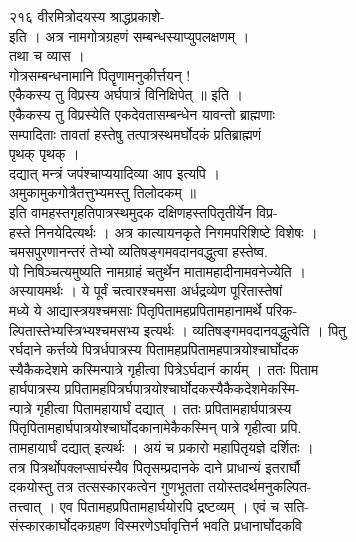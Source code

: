 \documentclass[11pt, openany]{book}
\begin{document}
{{{{{{{{{{{{{{{{{{{{{{{{{{{{{{{{{{{{{{{{{{{{{{{{{{{{{{{{{{{{{{{{{{{{{{{{{{{{{{{{{{{{{{{{{{{{{{{{{{{{{{{{{{{{{{{{{{{{{{{{{{{{{२१६ वीरमित्रोदयस्य श्राद्धप्रकाशे-}{\\
इति । अत्र नामगोत्रग्रहणं सम्बन्धस्याप्युपलक्षणम् ।\\
तथा च व्यास ।\\
गोत्रसम्बन्धनामानि पितॄणामनुकीर्त्तयन् !\\
एकैकस्य तु विप्रस्य अर्घपात्रं विनिक्षिपेत् ॥ इति ।\\
एकैकस्य तु विप्रस्येति एकदेवतासम्बन्धेन यावन्तो ब्राह्मणाः\\
सम्पादिताः तावतां हस्तेषु तत्पात्रस्थमर्घोदकं प्रतिब्राह्मणं\\
पृथक् पृथक् ।\\
दद्यात् मन्त्रं जपंश्चाप्ययादिव्या आप इत्यपि ।\\
अमुकामुकगोत्रैतत्तुभ्यमस्तु तिलोदकम् }{॥}{\\
इति वामहस्तगृहतिपात्रस्थमुदक दक्षिणहस्तपितृतीर्येन विप्र-\\
हस्ते निनयेदित्यर्थः । अत्र कात्यायनकृते निगमपरिशिष्टे विशेषः ।\\
चमसपुरणानन्तरं तेभ्यो व्यतिषङ्गमवदानवद्धुत्वा हस्तेष्व.\\
पो निषिञ्चत्यमुष्यति नामग्राहं चतुर्थेन मातामहादीनामवनेज्येति ।\\
अस्यायमर्थः । ये पूर्वं चत्वारश्चमसा अर्धद्रव्येण पूरितास्तेषां\\
मध्ये ये आद्यास्त्रयश्चमसाः पितृपितामहप्रपितामहानामर्थे परिक-\\
ल्पितास्तेभ्यस्त्रिभ्यश्चमसभ्य इत्यर्थः । व्यतिषङ्गमवदानवद्धुत्वेति ।
पितु\\
रर्घदाने कर्त्तव्ये पित्रर्धपात्रस्य पितामहप्रपितामहपात्रयोश्चार्घोदक\\
स्यैकैकदेशमे कस्मिन्पात्रे गृहीत्वा पित्रेऽर्घदानं कार्यम् । ततः पिताम\\
हार्घपात्रस्य प्रपितामहपित्रर्घपात्रयोश्चार्घोदकस्यैकैकदेशमेकस्मि-\\
न्पात्रे गृहीत्वा पितामहायार्घं दद्यात् । ततः प्रपितामहार्घपात्रस्य\\
पितृपितामहार्घपात्रयोश्चार्घोदकानामेकैकस्मिन् पात्रे गृहीत्वा प्रपि.\\
तामहायार्घं दद्यात् इत्यर्थः । अयं च प्रकारो महापितृयज्ञे दर्शितः ।\\
तत्र पित्रर्थोपक्लप्साघंस्यैव पितृसम्प्रदानके दाने प्राधान्यं इतरार्घौ\\
दकयोस्तु तत्र तत्सस्कारकत्वेन गुणभूतता तयोस्तदर्थमनुकल्पित-\\
तत्त्वात् । एव पितामहप्रपितामहार्घयोरपि द्रष्टव्यम् । एवं च सति-\\
संस्कारकार्घोदकग्रहण विस्मरणेऽर्घावृत्तिर्न भवति प्रधानार्घोदकवि\\
}}}}}}}}}}}}}}}}}}}}}}}}}}}}}}}}}}}}}}}}}}}}}}}}}}}}}}}}}}}}}}}}}}}}}}}}}}}}}}}}}}}}}}}}}}}}}}}}}}}}}}}}}}}}}}}}}}}}}}}}}}}}}
\end{document}
